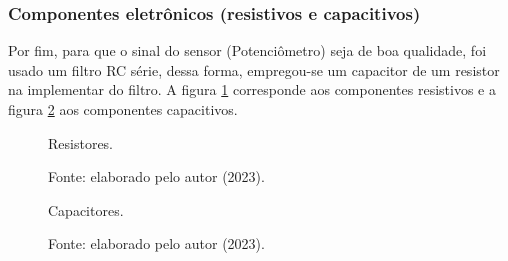 \newpage
\subsubsection{Componentes eletrônicos (resistivos e capacitivos)}

Por fim, para que o sinal do sensor (Potenciômetro) seja de boa qualidade, foi usado um filtro RC série, dessa forma, empregou-se um capacitor de um resistor na implementar do filtro. A figura \ref{fig3:image_09} corresponde aos componentes resistivos e a figura \ref{fig3:image_10} aos componentes capacitivos.


\begin{figure}[!h]
         \centering
         \caption{Resistores.}
         \caption*{Fonte: elaborado pelo autor (2023).}
         \label{fig3:image_09}
\end{figure}

\begin{figure}[!h]
         \centering
         \caption{Capacitores.}
         \caption*{Fonte: elaborado pelo autor (2023).}
         \label{fig3:image_10}
\end{figure}


